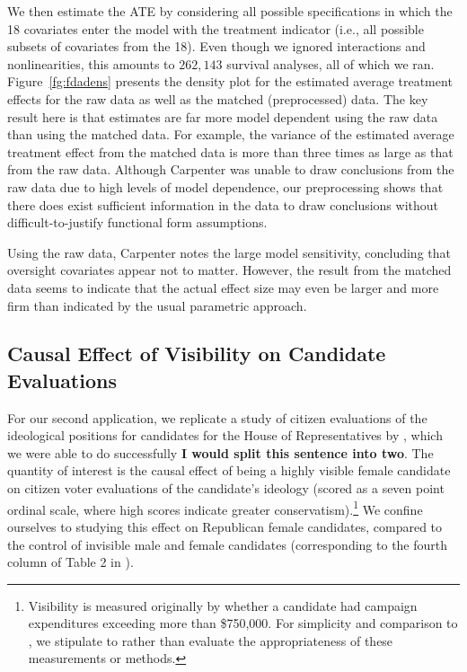 \documentclass[11pt,titlepage]{article}
\begin{document}
We then estimate the ATE by considering all possible specifications in
which the 18 covariates enter the model with the treatment indicator
(i.e., all possible subsets of covariates from the 18).  Even though
we ignored interactions and nonlinearities, this amounts to $262,143$
survival analyses, all of which we ran. Figure~\ref{fg:fdadens}
presents the density plot for the estimated average treatment effects
for the raw data as well as the matched (preprocessed) data.  The key
result here is that estimates are far more model dependent using the
raw data than using the matched data.  For example, the variance of
the estimated average treatment effect from the matched data is more
than three times as large as that from the raw data.  Although
Carpenter was unable to draw conclusions from the raw data due to
high levels of model dependence, our preprocessing shows that there
does exist sufficient information in the data to draw conclusions
without difficult-to-justify functional form assumptions.

Using the raw data, Carpenter notes the large model sensitivity,
concluding that oversight covariates appear not to matter.  However,
the result from the matched data seems to indicate that the actual
effect size may even be larger and more firm than indicated by the
usual parametric approach.

\subsection{Causal Effect of Visibility on Candidate
  Evaluations}

For our second application, we replicate a study of citizen
evaluations of the ideological positions for candidates for the House
of Representatives by \citet{Koch02}, which we were able to do
successfully {\bf I would split this sentence into two}.  The quantity
of interest is the causal effect of being a highly visible female
candidate on citizen voter evaluations of the candidate's ideology
(scored as a seven point ordinal scale, where high scores indicate
greater conservatism).\footnote{Visibility is measured originally by
  whether a candidate had campaign expenditures exceeding more than
  \$750,000.  For simplicity and comparison to \citet{Koch02}, we
  stipulate to rather than evaluate the appropriateness of these
  measurements or methods.}  We confine ourselves to studying this
effect on Republican female candidates, compared to the control of
invisible male and female candidates (corresponding to the fourth
column of Table 2 in \citet[p.  459]{Koch02}).
\end{document}
